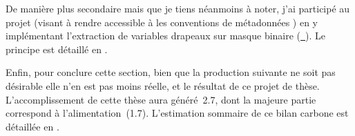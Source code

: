 De manière plus secondaire mais que je tiens néanmoins à noter, j'ai participé au projet  (visant à rendre accessible à  les conventions de métadonnées ) en y implémentant l'extraction de variables drapeaux sur masque binaire (\href{https://github.com/xarray-contrib/cf-xarray/pull/354}{~}).
Le principe est détaillé en .

\bigskip

Enfin, pour conclure cette section, bien que la production suivante ne soit pas désirable elle n'en est pas moins réelle, et le résultat de ce projet de thèse.
L'accomplissement de cette thèse aura généré~\qty{2.7}{\tcarbone}, dont la majeure partie correspond à l'alimentation~(\qty{1.7}{\tcarbone}).
L'estimation sommaire de ce bilan carbone est détaillée en .
